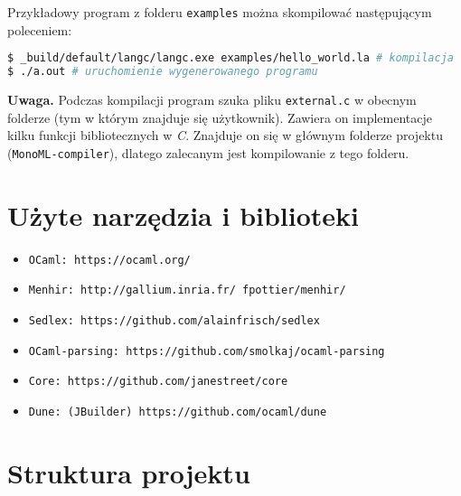 \documentclass[declaration,shortabstract]{iithesis}
\begin{document}
Przykładowy program z folderu \texttt{examples} można skompilować następującym 
poleceniem: 
\begin{lstlisting}[language=bash]
$ _build/default/langc/langc.exe examples/hello_world.la # kompilacja 
$ ./a.out # uruchomienie wygenerowanego programu 
\end{lstlisting}

\textbf{Uwaga.} Podczas kompilacji program szuka pliku \texttt{external.c} w 
obecnym folderze (tym w którym znajduje się użytkownik). Zawiera on  
implementacje kilku funkcji bibliotecznych w \textit{C}. Znajduje on się w 
głównym folderze projektu (\texttt{MonoML-compiler}), dlatego zalecanym jest 
kompilowanie z tego folderu.

\section{Użyte narzędzia i biblioteki}

\begin{itemize}
  \item \texttt{OCaml: https://ocaml.org/}
  \item \texttt{Menhir: http://gallium.inria.fr/~fpottier/menhir/}
  \item \texttt{Sedlex: https://github.com/alainfrisch/sedlex}
  \item \texttt{OCaml-parsing: https://github.com/smolkaj/ocaml-parsing}
  \item \texttt{Core: https://github.com/janestreet/core} 
  \item \texttt{Dune: (JBuilder) https://github.com/ocaml/dune} 
\end{itemize}



\section{Struktura projektu}
\end{document}
